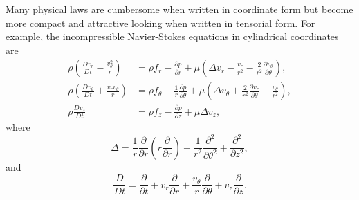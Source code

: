 
\begin{rem}
  Many physical laws are cumbersome
  when written in coordinate form
  but become more compact and attractive looking
  when written in tensorial form.
  For example,
  the incompressible Navier-Stokes equations in cylindrical coordinates are
  \begin{align*}
    \rho\left(\frac{Dv_r}{Dt}-\frac{v_{\theta}^2}{r}\right) &= \rho f_r-\frac{\partial p}{\partial r} + \mu\left(\Delta v_r-\frac{v_r}{r^2}-\frac{2}{r^2}\frac{\partial v_{\theta}}{\partial \theta}\right), \\
    \rho\left(\frac{Dv_{\theta}}{Dt}+\frac{v_rv_{\theta}}{r}\right) &= \rho f_{\theta}-\frac{1}{r}\frac{\partial p}{\partial\theta} + \mu\left(\Delta v_{\theta}+\frac{2}{r^2}\frac{\partial v_r}{\partial\theta}-\frac{v_{\theta}}{r^2}\right), \\
    \rho \frac{Dv_z}{Dt} &= \rho f_z-\frac{\partial p}{\partial z}+\mu\Delta v_z,
  \end{align*}
  where
  \begin{equation*}
    \Delta = \frac{1}{r}\frac{\partial}{\partial r}\left(r \frac{\partial}{\partial r}\right)+\frac{1}{r^2}\frac{\partial^2}{\partial \theta^2}+\frac{\partial^2}{\partial z^2},
  \end{equation*}
  and
  \begin{equation*}
    \frac{D}{Dt} = \frac{\partial}{\partial t}+v_r \frac{\partial}{\partial r}+\frac{v_{\theta}}{r}\frac{\partial}{\partial\theta}+v_z \frac{\partial}{\partial z}.
  \end{equation*}
\end{rem}

